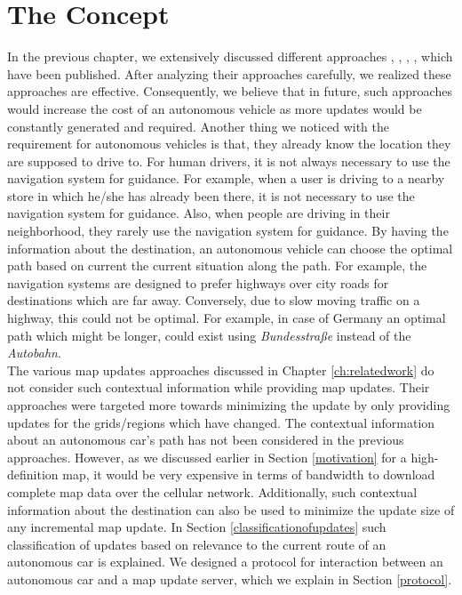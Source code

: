 \section{The Concept} \label{concept}
In the previous chapter, we extensively discussed different approaches \cite{min2008mobile}, \cite{cooper2001incremental}, \cite{asahara2008locally}, \cite{flament2003actmap}, \cite{fischer2012technique} which have been published. After analyzing their approaches carefully, we realized these approaches are effective. Consequently, we believe that in future, such approaches would increase the cost of an autonomous vehicle as more updates would be constantly generated and required. Another thing we noticed with the requirement for autonomous vehicles is that, they already know the location they are supposed to drive to. For human drivers, it is not always necessary to use the navigation system for guidance. For example, when a user is driving to a nearby store in which he/she has already been there, it is not necessary to use the navigation system for guidance. Also, when people are driving in their neighborhood, they rarely use the navigation system for guidance. By having the information about the destination, an autonomous vehicle can choose the optimal path based on current the current situation along the path. For example, the navigation systems are designed to prefer highways over city roads for destinations which are far away. Conversely, due to slow moving traffic on a highway, this could not be optimal. For example, in case of Germany an optimal path which might be longer, could exist using \textit{Bundesstra{\ss}e} instead of the \textit{Autobahn}. \\

The various map updates approaches discussed in Chapter \ref{ch:relatedwork} do not consider such contextual information while providing map updates. Their approaches were targeted more towards minimizing the update by only providing updates for the grids/regions which have changed. The contextual information about an autonomous car's path has not been considered in the previous approaches. However, as we discussed earlier in Section \ref{motivation} for a high-definition map, it would be very expensive in terms of bandwidth to download complete map data over the cellular network. Additionally, such contextual information about the destination can also be used to minimize the update size of any incremental map update. In Section \ref{classificationofupdates} such classification of updates based on relevance to the current route of an autonomous car is explained. We designed a protocol for interaction between an autonomous car and a map update server, which we explain in Section \ref{protocol}.
